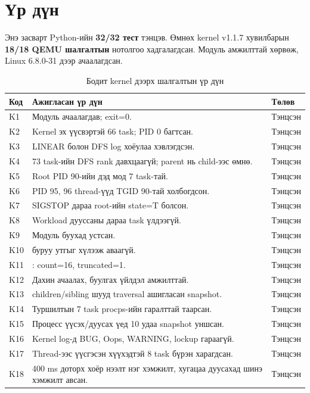 \section{Үр дүн}
Энэ засварт Python-ийн \textbf{32/32 тест} тэнцэв. Өмнөх kernel v1.1.7 хувилбарын \textbf{18/18 QEMU шалгалтын} нотолгоо хадгалагдсан. Модуль амжилттай хөрвөж, Linux 6.8.0-31 дээр ачаалагдсан.
\begin{table}[H]
\centering\small
\caption{Бодит kernel дээрх шалгалтын үр дүн}
\begin{tabularx}{\textwidth}{|P{1.0cm}|Y|P{2.0cm}|}\hline
{}\textbf{Код} & \textbf{Ажигласан үр дүн} & \textbf{Төлөв} \\\hline
K1 & Модуль ачаалагдав;  exit=0. & Тэнцсэн \\\hline
K2 & Kernel эх үүсвэртэй 66 task; PID 0 багтсан. & Тэнцсэн \\\hline
K3 & LINEAR болон DFS log хоёулаа хэвлэгдсэн. & Тэнцсэн \\\hline
K4 & 73 task-ийн DFS rank давхцаагүй; parent нь child-ээс өмнө. & Тэнцсэн \\\hline
K5 & Root PID 90-ийн дэд мод 7 task-тай. & Тэнцсэн \\\hline
K6 & PID 95, 96 thread-үүд TGID 90-тай холбогдсон. & Тэнцсэн \\\hline
K7 & SIGSTOP дараа root-ийн state=T болсон. & Тэнцсэн \\\hline
K8 & Workload дууссаны дараа  task үлдээгүй. & Тэнцсэн \\\hline
K9 & Модуль буухад  устсан. & Тэнцсэн \\\hline
K10 &  буруу утгыг хүлээж аваагүй. & Тэнцсэн \\\hline
K11 & : count=16, truncated=1. & Тэнцсэн \\\hline
K12 & Дахин ачаалах, буулгах үйлдэл амжилттай. & Тэнцсэн \\\hline
K13 & children/sibling шууд traversal ашигласан snapshot. & Тэнцсэн \\\hline
K14 & Туршилтын 7 task procps-ийн гаралттай таарсан. & Тэнцсэн \\\hline
K15 & Процесс үүсэх/дуусах үед 10 удаа snapshot уншсан. & Тэнцсэн \\\hline
K16 & Kernel log-д BUG, Oops, WARNING, lockup гараагүй. & Тэнцсэн \\\hline
K17 & Thread-ээс үүсгэсэн хүүхэдтэй 8 task бүрэн харагдсан. & Тэнцсэн \\\hline
K18 & 400 ms доторх хоёр нээлт нэг хэмжилт, хугацаа дуусахад шинэ хэмжилт авсан. & Тэнцсэн \\\hline
\end{tabularx}
\end{table}
